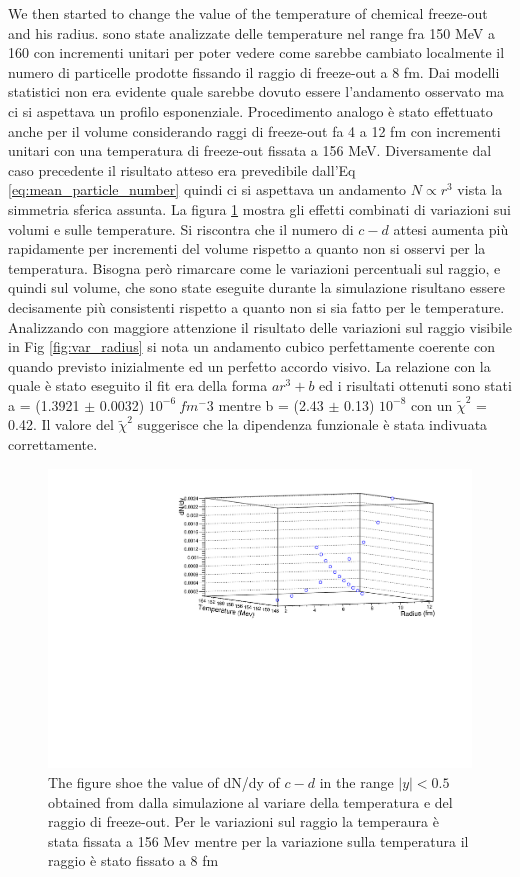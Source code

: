 \documentclass[12pt,a4paper]{book}
\begin{document}
	We then started to change the value of the temperature of chemical freeze-out and his radius. sono state analizzate delle temperature nel range fra 150 MeV a 160 con incrementi unitari per poter vedere come sarebbe cambiato localmente il numero di particelle prodotte fissando il raggio di freeze-out a 8 fm. Dai modelli statistici non era evidente quale sarebbe dovuto essere l'andamento osservato ma ci si aspettava un profilo esponenziale. Procedimento analogo è stato effettuato anche per il volume considerando raggi di freeze-out fa 4 a 12 fm con incrementi unitari con una temperatura di freeze-out fissata a 156 MeV. Diversamente dal caso precedente il risultato atteso era prevedibile dall'Eq \ref{eq:mean_particle_number} quindi ci si aspettava un andamento $N \propto r^3$ vista la simmetria sferica assunta. La figura \ref{fig:2dgraph} mostra gli effetti combinati di variazioni sui volumi e sulle temperature. Si riscontra che il numero di $c-d$ attesi aumenta più rapidamente per incrementi del volume rispetto a quanto non si osservi per la temperatura. Bisogna però rimarcare come le variazioni percentuali sul raggio, e quindi sul volume, che sono state eseguite durante la simulazione risultano essere decisamente più consistenti rispetto a quanto non si sia fatto per le temperature. Analizzando con maggiore attenzione il risultato delle variazioni sul raggio visibile in Fig \ref{fig:var_radius} si nota un andamento cubico perfettamente coerente con quando previsto inizialmente ed un perfetto accordo visivo. La relazione con la quale è stato eseguito il fit era della forma $a r^3 +b$ ed i risultati ottenuti sono stati a = (1.3921 $\pm$ 0.0032) $10^{-6} \ fm^-3$ mentre b = (2.43 $\pm$ 0.13) $10^{-8}$ con un $\tilde{\chi}^2$ = 0.42. Il valore del $\tilde{\chi}^2$ suggerisce che la dipendenza funzionale è stata indivuata correttamente.  
	\begin{figure}
		\centering
			\includegraphics[width=0.8 \linewidth]{pictures/2dgraph.pdf}
		\caption{The figure shoe the value of dN/dy of $c-d$ in the range $|y|<0.5$ obtained from dalla simulazione al variare della temperatura e del raggio di freeze-out. Per le variazioni sul raggio la temperaura è stata fissata a 156 Mev mentre per la variazione sulla temperatura il raggio è stato fissato a 8 fm}
		\label{fig:2dgraph}
	\end{figure}
	
\end{document}
